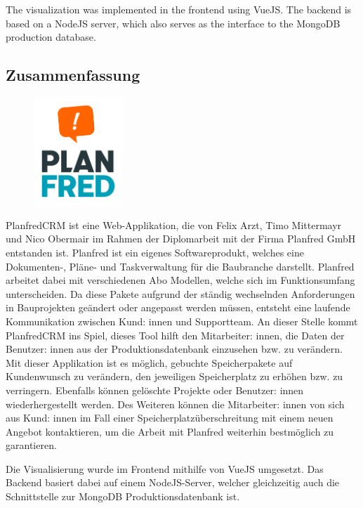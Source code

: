 The visualization was implemented in the frontend using VueJS. The backend is based on a NodeJS server, which also serves as the interface to the MongoDB production database.
\newpage
\begin{spacing}{1}
    \chapter*{Zusammenfassung}
\end{spacing}
\begin{figure}
    \begin{center}
      \includegraphics[width=0.3\textwidth]{pics/PLANFRED-Logo-sq-bubble_sRGB.png}
    \end{center}
\end{figure}
PlanfredCRM ist eine Web-Applikation, die von Felix Arzt, Timo Mittermayr und Nico Obermair im Rahmen der Diplomarbeit mit der Firma Planfred GmbH entstanden ist. Planfred ist ein eigenes Softwareprodukt, welches eine Dokumenten-, Pläne- und Taskverwaltung für die Baubranche darstellt. Planfred arbeitet dabei mit verschiedenen Abo Modellen, welche sich im Funktionsumfang unterscheiden. Da diese Pakete aufgrund der ständig wechselnden Anforderungen in Bauprojekten geändert oder angepasst werden müssen, entsteht eine laufende Kommunikation zwischen Kund: innen und Supportteam. An dieser Stelle kommt PlanfredCRM ins Spiel, dieses Tool hilft den Mitarbeiter: innen, die Daten der Benutzer: innen aus der Produktionsdatenbank einzusehen bzw. zu verändern. Mit dieser Applikation ist es möglich, gebuchte Speicherpakete auf Kundenwunsch zu verändern, den jeweiligen Speicherplatz zu erhöhen bzw. zu verringern. Ebenfalls können gelöschte Projekte oder Benutzer: innen wiederhergestellt werden. Des Weiteren können die Mitarbeiter: innen von sich aus Kund: innen im Fall einer Speicherplatzüberschreitung mit einem neuen Angebot kontaktieren, um die Arbeit mit Planfred weiterhin bestmöglich zu garantieren.

Die Visualisierung wurde im Frontend mithilfe von VueJS umgesetzt. Das Backend basiert dabei auf einem NodeJS-Server, welcher gleichzeitig auch die Schnittstelle zur MongoDB Produktionsdatenbank ist.

